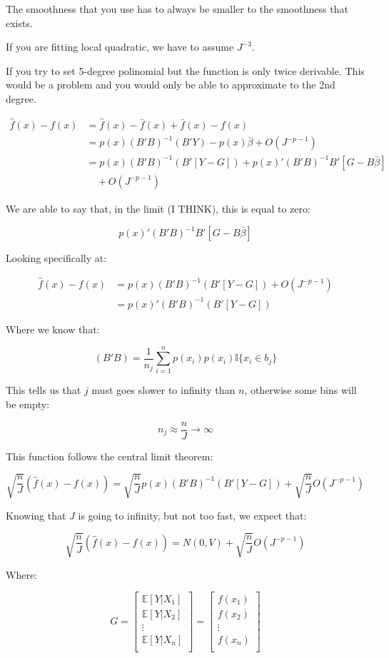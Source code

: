 \documentclass{article}
\begin{document}
The smoothness that you use has to always be smaller to the smoothness that exists.

If you are fitting local quadratic, we have to assume $J^{-3}$.

If you try to set 5-degree polinomial but the function is only twice derivable. This would be a problem and you would only be able to approximate to the 2nd degree.

\begin{align*}
    \hat{f}(x) - f(x) &= \hat{f}(x) - \bar{f}(x) + \bar{f}(x) - f(x) \\
    &= p(x) (B' B)^{-1} (B' Y) - p(x) \bar{\beta} + O(J^{-p-1}) \\
    &= p(x) (B' B)^{-1} (B' [Y-G]) + p(x)' (B' B)^{-1} B' [G - B \bar{\beta}] \\
    &\quad + O(J^{-p-1})
\end{align*}

We are able to say that, in the limit (I THINK), this is equal to zero:

$$
p(x)' (B' B)^{-1} B' [G - B \bar{\beta}] 
$$

Looking specifically at:

\begin{align*}
    \hat{f}(x) - f(x) &= p(x) (B' B)^{-1} (B' [Y-G]) + O(J^{-p-1}) \\
    &= p(x)' (B'B)^{-1} (B' [Y - G])
\end{align*}

Where we know that:

$$
(B'B) = \frac{1}{n_j} \sum_{i=1}^{n} p(x_i)p(x_i) \mathbb{I} \{ x_i \in b_j \}
$$

This tells us that $j$ must goes slower to infinity than $n$, otherwise some bins will be empty:

$$
n_j \approx \frac{n}{J} \to \infty
$$

This function follows the central limit theorem:

$$
\sqrt{\frac{n}{J}} (\hat{f}(x) - f(x)) = \sqrt{\frac{n}{J}} p(x) (B' B)^{-1} (B' [Y-G]) + \sqrt{\frac{n}{J}} O(J^{-p-1})
$$

Knowing that $J$ is going to infinity, but not too fast, we expect that:

$$
\sqrt{\frac{n}{J}} (\hat{f}(x) - f(x)) = N(0, V) + \sqrt{\frac{n}{J}} O(J^{-p-1})
$$

Where:

$$
G = \left[
\begin{matrix*}
    \mathbb{E}[Y | X_1] \\
    \mathbb{E}[Y | X_2] \\
    \vdots \\
    \mathbb{E}[Y | X_n] \\
\end{matrix*}
\right]
=
\left[
    \begin{matrix*}
        f(x_1) \\
        f(x_2) \\
        \vdots \\
        f(x_n) \\
    \end{matrix*}
\right]
$$
\end{document}
